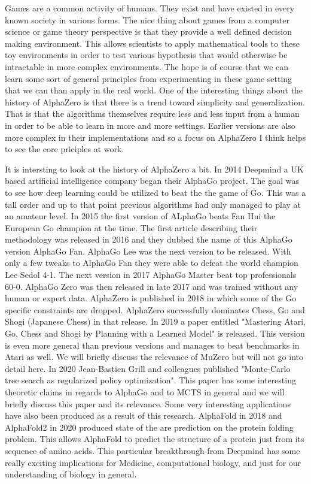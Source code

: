 Games are a common activity of humans. They exist and have existed in every known society in various forms. The nice thing about games from a computer science or game theory perspective is that they provide a well defined decision making environment. This allows scientists to apply mathematical tools to these toy environments in order to test various hypothesis that would otherwise be intractable in more complex environments. The hope is of course that we can learn some sort of general principles from experimenting in these game setting that we can than apply in the real world. One of the interesting things about the history of AlphaZero is that there is a trend toward simplicity and generalization. That is that the algorithms themselves require less and less input from a human in order to be able to learn in more and more settings. Earlier versions are also more complex in their implementations and so a focus on AlphaZero I think helps to see the core priciples at work. 

It is intersting to look at the history of AlphaZero a bit. In 2014 Deepmind a UK based artificial intelligence company began their AlphaGo project. The goal was to see how deep learning could be utilized to beat the the game of Go. This was a tall order and up to that point previous algorithms had only managed to play at an amateur level. In 2015 the first version of ALphaGo beats Fan Hui the European Go champion at the time. The first article describing their methodology was released in 2016 and they dubbed the name of this AlphaGo version AlphaGo Fan. AlphaGo Lee was the next version to be released. With only a few tweaks to AlphaGo Fan they were able to defeat the world champion Lee Sedol 4-1. The next version in 2017 AlphaGo Master beat top professionals 60-0. AlphaGo Zero was then released in late 2017 and was trained without any human or expert data. AlphaZero is published in 2018 in which some of the Go specific constraints are dropped. AlphaZero successfully dominates Chess, Go and Shogi (Japanese Chess) in that release. In 2019 a paper entitled "Mastering Atari, Go, Chess and Shogi by Planning with a Learned Model" is released. This version is even more general than previous versions and manages to beat benchmarks in Atari as well. We will briefly discuss the relevance of MuZero but will not go into detail here. In 2020 Jean-Bastien Grill and colleagues published "Monte-Carlo tree search as regularized policy optimization". This paper has some interesting theoretic claims in regards to AlphaGo and to MCTS in general and we will briefly discuss this paper and its relevance. Some very interesting applications have also been produced as a result of this research. AlphaFold in 2018 and AlphaFold2 in 2020 produced state of the are prediction on the protein folding problem. This allows AlphaFold to predict the structure of a protein just from its sequence of amino acids. This particular breakthrough from Deepmind has some really exciting implications for Medicine, computational biology, and just for our understanding of biology in general. 